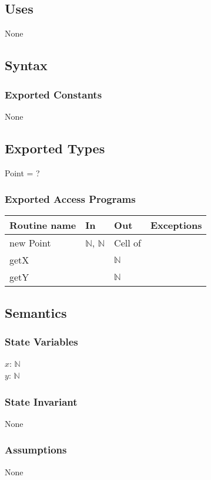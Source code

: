 \documentclass[12pt]{article}
\begin{document}
\subsection* {Uses}
None
\subsection* {Syntax}
\subsubsection* {Exported Constants}
None
\subsection* {Exported Types}
Point = ?

\subsubsection* {Exported Access Programs}

\begin{tabular}{| l | l | l | p{6cm} |}
\hline
\textbf{Routine name} & \textbf{In} & \textbf{Out} & \textbf{Exceptions}\\
\hline
new Point & $\mathbb{N}$, $\mathbb{N}$ & Cell of  & \\
\hline
getX & &  $\mathbb{N}$ & \\
\hline
getY & & $\mathbb{N}$& \\
\hline
\end{tabular}

\subsection* {Semantics}
\subsubsection*{State Variables}
$x$: $\mathbb{N}$\\
$y$: $\mathbb{N}$
\subsubsection* {State Invariant}
None

\subsubsection* {Assumptions}
None
\end{document}
